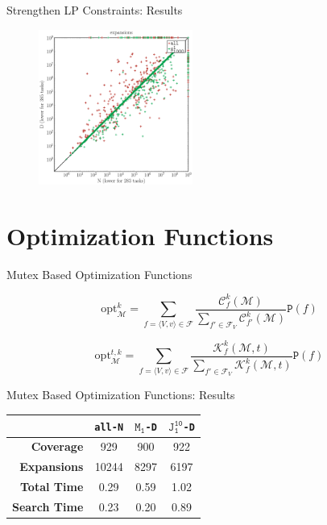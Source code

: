 \documentclass[aspectratio=169, xcolor=dvipsnames]{beamer}
\begin{document}
    \begin{frame}[c]{Strengthen LP Constraints: Results}
        \begin{figure}
            \includegraphics[width=0.45\textwidth]{N_D_exp}
        \end{figure}
    \end{frame}

    \section{Optimization Functions}
    \begin{frame}[c]{Mutex Based Optimization Functions}
        \begin{definition}
            \[\mathrm{opt}^k_\mathcal{M}=\sum_{f=\langle V,v \rangle\in\mathcal{F}}\frac{\mathcal{C}_f^k(\mathcal{M})}{\sum_{f'\in\mathcal{F}_V}\mathcal{C}_{f'}^k(\mathcal{M})}\mathtt{P}(f)\]
        \end{definition}

        \begin{definition}
            \[\mathrm{opt}^{t,k}_\mathcal{M}=\sum_{f=\langle V,v \rangle\in\mathcal{F}}\frac{\mathcal{K}^k_f(\mathcal{M}, t)}{\sum_{f'\in\mathcal{F}_V}\mathcal{K}^k_f(\mathcal{M}, t)}\mathtt{P}(f)\]
        \end{definition}
    \end{frame}

    \begin{frame}[c]{Mutex Based Optimization Functions: Results}
        \begin{table}[ht!]
            \centering
            \begin{tabular}{|r|c|c|c|}
                \hline
                & \textbf{\texttt{all-N}} & \textbf{$\texttt{M}_{\texttt{1}}$\texttt{-D}} & \textbf{$\texttt{J}_{\texttt{1}}^{\texttt{10}}$\texttt{-D}} \\
                \hline \hline
                \textbf{Coverage}       & 929 & 900 & 922 \\ \hline
                \textbf{Expansions}     & 10244 & 8297 & 6197\\ \hline
                \textbf{Total Time}     & 0.29 & 0.59 & 1.02 \\ \hline
                \textbf{Search Time}    & 0.23 & 0.20 & 0.89 \\ \hline
            \end{tabular}
        \end{table}
    \end{frame}
\end{document}
